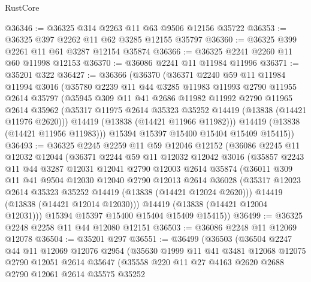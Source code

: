 \begin{lexlean}{RustCore}
\begin{coremodule}
@36346 := @36325 @314 @2263 @11 @63 @9506 @12156 @35722
@36353 := @36325 @397 @2262 @11 @62 @3285 @12155 @35797
@36360 := @36325 @399 @2261 @11 @61 @3287 @12154 @35874
@36366 := @36325 @2241 @2260 @11 @60 @11998 @12153
@36370 := @36086 @2241 @11 @11984 @11996
@36371 := @35201 @322
@36427 := @36366
    (@36370
      (@36371
        @2240
        @59
        @11
        @11984
        @11994
        @3016
        (@35780
          @2239
          @11
          @44
          @3285
          @11983
          @11993
          @2790
          @11955
          @2614
          @35797
          (@35945
            @309
            @11
            @41
            @2686
            @11982
            @11992
            @2790
            @11965
            @2614
            @35962
            (@35317 @11975 @2614 @35323 @35252 @14419 (@13838 (@14421 @11976 @2620)))
            @14419
            (@13838 (@14421 @11966 @11982)))
          @14419
          (@13838 (@14421 @11956 @11983)))
        @15394
        @15397
        @15400
        @15404
        @15409
        @15415))
@36493 := @36325
    @2245
    @2259
    @11
    @59
    @12046
    @12152
    (@36086
      @2245
      @11
      @12032
      @12044
      (@36371
        @2244
        @59
        @11
        @12032
        @12042
        @3016
        (@35857
          @2243
          @11
          @44
          @3287
          @12031
          @12041
          @2790
          @12003
          @2614
          @35874
          (@36011
            @309
            @11
            @41
            @9504
            @12030
            @12040
            @2790
            @12013
            @2614
            @36028
            (@35317 @12023 @2614 @35323 @35252 @14419 (@13838 (@14421 @12024 @2620)))
            @14419
            (@13838 (@14421 @12014 @12030)))
          @14419
          (@13838 (@14421 @12004 @12031)))
        @15394
        @15397
        @15400
        @15404
        @15409
        @15415))
@36499 := @36325 @2248 @2258 @11 @44 @12080 @12151
@36503 := @36086 @2248 @11 @12069 @12078
@36504 := @35201 @297
@36551 := @36499
    (@36503
      (@36504
        @2247
        @44
        @11
        @12069
        @12076
        @2954
        (@35630
          @1999
          @11
          @41
          @3481
          @12068
          @12075
          @2790
          @12051
          @2614
          @35647
          (@35558
            @220
            @11
            @27
            @4163
            @2620
            @2688
            @2790
            @12061
            @2614
            @35575
            @35252

\end{coremodule}
\end{lexlean}
